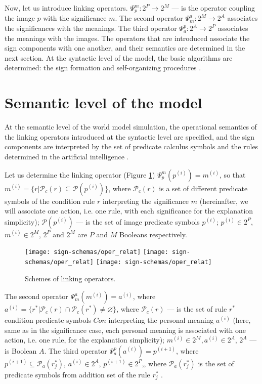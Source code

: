 \documentclass[12pt]{scrartcl}
\begin{document}
	Now, let us introduce linking operators. $\Psi_p^m:2^P\rightarrow 2^M$ --- is the operator coupling the image $p$ with the significance $m$. The second operator $\Psi_m^a:2^M\rightarrow 2^A$ associates the significances with the meanings. The third operator $\Psi_a^p: 2^A\rightarrow 2^P$ associates the meanings with the images. The operators that are introduced associate the sign components with one another, and their semantics are determined in the next section. At the syntactic level of the  model, the basic algorithms are determined: the sign formation and self-organizing procedures \cite{Osipov2014c}.

	\section{Semantic level of the model}\label{sec:semantic}
	
	At the semantic level of the world model simulation, the operational semantics of the linking operators introduced at the syntactic level are specified, and the sign components are interpreted by the set of predicate calculus symbols and the rules determined in the artificial intelligence \cite{Osipov2015c,Osipov2016a}.
	
	Let us determine the linking operator (Figure \ref{fig:linkers}) $\Psi_p^m(p^{(i)})=m^{(i)}$, so that $m^{(i)}=\{r|\mathcal{P}_c(r)\subseteq \mathcal{P}(p^{(i)})\}$, where $\mathcal{P}_c(r)$ is a set of different predicate symbols of the condition rule $r$ interpreting the significance $m$ (hereinafter, we will associate one action, i.e. one rule, with each significance for the explanation simplicity); $\mathcal{P}(p^{(i)})$ --- is the set of image predicate symbols $p^{(i)}$; $p^{(i)}\in 2^P$, $m^{(i)}\in 2^M$, $2^P$ and $2^M$ are $P$ and $M$ Booleans respectively.
	
	
	\begin{figure}[H]
		\label{fig:linkers}
		\centering
		\texttt{[image: sign-schemas/oper\_relat]}
		\texttt{[image: sign-schemas/oper\_relat]}
		\texttt{[image: sign-schemas/oper\_relat]}
		\caption{Schemes of linking operators.}		
	\end{figure}
	
	The second operator $\Psi_m^a(m^{(i)})=a^{(i)}$, where  $a^{(i)}=\{r^*|\mathcal{P}_c(r)\cap \mathcal{P}_c(r^*)\not=\varnothing\}$, where $\mathcal{P}_c(r)$ --- is the set of rule $r^*$ condition predicate symbols $Con$ interpreting the personal meaning $a^{(i)}$ (here, same as in the significance case, each personal meaning is associated with one action, i.e. one rule, for the explanation simplicity); $m^{(i)}\in 2^M, a^{(i)}\in 2^A$, $2^A$ --- is Boolean $A$. The third operator $\Psi_a^p(a^{(i)})=p^{(i+1)}$, where $p^{(i+1)}\subseteq \mathcal{P}_a(r_j^*)$, $a^{(i)}\in 2^A$, $p^{(i+1)}\in 2^P$,, where $\mathcal{P}_a(r_j^*)$ is the set of predicate symbols from addition set of the rule $r_j^*$ .
	
\end{document}
